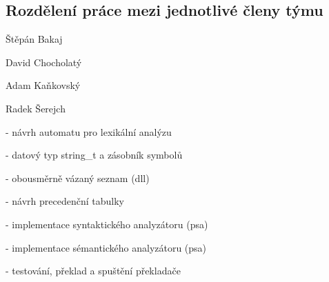 \documentclass[a4paper, 12pt]{article}
\begin{document}
\subsection{Rozdělení práce mezi jednotlivé členy týmu}
\begin{itemize}
    \begin{minipage}{0.25\linewidth}   
        \item Štěpán Bakaj
        \item[]\item[]\item[]\item[]\item[]\item[]\item[]
        \item David Chocholatý
        \item[]\item[]\item[]\item[]\item[]\item[]\item[]
        \item Adam Kaňkovský
        \item[]\item[]\item[]\item[]\item[]\item[]\item[]
        \item Radek Šerejch
        \item[]\item[]\item[]\item[]\item[]\item[]\item[]
        \vspace{0.25cm}
    \end{minipage}
    \begin{minipage}{0.7\linewidth}
        \item[-] návrh automatu pro lexikální analýzu
        \item[-] datový typ string\_t a zásobník symbolů
        \item[-] obousměrně vázaný seznam (dll)
        \item[-] návrh precedenční tabulky
        \item[-] implementace syntaktického analyzátoru (psa)
        \item[-] implementace sémantického analyzátoru (psa)
        \item[-] testování, překlad a spuštění překladače
        \item[]
        

\end{minipage}
\end{itemize}
\end{document}
